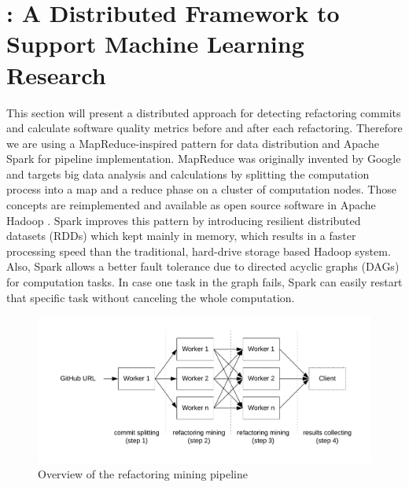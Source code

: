 
\section{\iris: A Distributed Framework to Support Machine Learning Research}
\label{sec:approach}

This section will present a distributed approach for detecting refactoring commits and calculate software quality metrics before and after each refactoring. Therefore we are using a MapReduce-inspired pattern for data distribution and Apache Spark for pipeline implementation. MapReduce was originally invented by Google and targets big data analysis and calculations by splitting the computation process into a map and a reduce phase \cite{mapreduce2008} on a cluster of computation nodes. Those concepts are reimplemented and available as open source software in Apache Hadoop \cite{hadoop}. Spark improves this pattern by introducing resilient distributed datasets (RDDs) which kept mainly in memory, which results in a faster processing speed than the traditional, hard-drive storage based Hadoop system. Also, Spark allows a better fault tolerance due to directed acyclic graphs (DAGs) for computation tasks. In case one task in the graph fails, Spark can easily restart that specific task without canceling the whole computation.\\

\begin{figure}
\caption{Overview of the refactoring mining pipeline}
\centering
\includegraphics[scale=0.5]{pipeline}
\end{figure}

